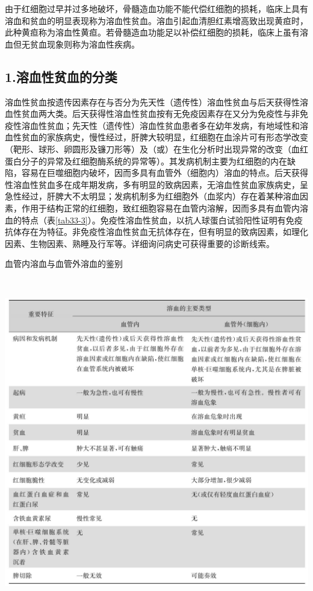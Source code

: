 由于红细胞过早并过多地破坏，骨髓造血功能不能代偿红细胞的损耗，临床上具有溶血和贫血的明显表现称为溶血性贫血。溶血引起血清胆红素增高致出现黄疸时，此种黄疸称为溶血性黄疸。若骨髓造血功能足以补偿红细胞的损耗，临床上虽有溶血但无贫血现象则称为溶血性疾病。

\subsection{1.溶血性贫血的分类}

溶血性贫血按遗传因素存在与否分为先天性（遗传性）溶血性贫血与后天获得性溶血性贫血两大类。后天获得性溶血性贫血按有无免疫因素存在又分为免疫性与非免疫性溶血性贫血；先天性（遗传性）溶血性贫血患者多在幼年发病，有地域性和溶血性贫血的家族病史，慢性经过，肝脾大较明显，红细胞在血涂片可有形态学改变（靶形、球形、卵圆形及镰刀形等）及（或）在生化分析时出现异常的改变（血红蛋白分子的异常及红细胞酶系统的异常等）。其发病机制主要为红细胞的内在缺陷，容易在巨噬细胞内破坏，因而多具有血管外（细胞内）溶血的特点。后天获得性溶血性贫血多在成年期发病，多有明显的致病因素，无溶血性贫血家族病史，呈急性经过，肝脾大不太明显；发病机制多为红细胞外（血浆内）存在着某种溶血因素，作用于结构正常的红细胞，致红细胞容易在血管内溶解，因而多具有血管内溶血的特点（表\ref{tab33-3}）。免疫性溶血性贫血，以抗人球蛋白试验阳性证明有免疫抗体存在为特征。非免疫性溶血性贫血无抗体存在，但有明显的致病因素，如理化因素、生物因素、熟睡及行军等。详细询问病史可获得重要的诊断线索。

\begin{table}[htbp]
\centering
\caption{血管内溶血与血管外溶血的鉴别}
\label{tab33-3}
\includegraphics[width=5.95833in,height=5.66667in]{./images/Image00165.jpg}
\end{table}

